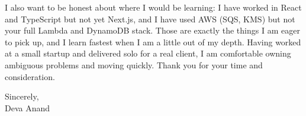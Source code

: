 \documentclass[letterpaper,11pt]{article}
\begin{document}
I also want to be honest about where I would be learning: I have worked in React and TypeScript but not yet Next.js, and I have used AWS (SQS, KMS) but not your full Lambda and DynamoDB stack. Those are exactly the things I am eager to pick up, and I learn fastest when I am a little out of my depth. Having worked at a small startup and delivered solo for a real client, I am comfortable owning ambiguous problems and moving quickly. Thank you for your time and consideration.

\vspace{4pt}

Sincerely, \\
Deva Anand
\end{document}
